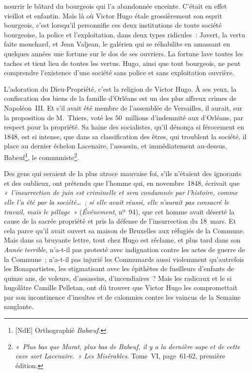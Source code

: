 \documentclass[french,twoside]{book} %
\begin{document}
\label{p45}nourrir le bâtard du bourgeois qui l’a abandonnée enceinte. C’était en effet vieillot et enfantin. Mais là où Victor Hugo étale grossièrement son esprit bourgeois, c’est lorsqu’il personnifie ces deux institutions de toute société bourgeoise, la police et l’exploitation, dans deux types ridicules : Javert, la vertu faite mouchard, et Jean Valjean, le galérien qui se réhabilite en amassant en quelques années une fortune sur le dos de ses ouvriers. La fortune lave toutes les taches et tient lieu de toutes les vertus. Hugo, ainsi que tout bourgeois, ne peut comprendre l’existence d’une société sans police et sans exploitation ouvrière.\par
L’adoration du Dieu-Propriété, c’est la religion de Victor Hugo. À ses yeux, la confiscation des biens de la famille d’Orléans est un des plus affreux crimes de Napoléon III. Et s’il avait été membre de l’assemblée de Versailles, il aurait, sur la proposition de M. Thiers, voté les 50 millions d’indemnité aux d’Orléans, par respect pour la propriété. Sa haine des socialistes, qu’il dénonça si férocement en 1848, est si intense, que dans sa classification des êtres, qui troublent la société, il place au dernier échelon Lacenaire, l’assassin, et immédiatement au-dessus, Babeuf\footnote{[NdE] Orthographié \emph{Babœuf.}}, le communiste\footnote{\emph{« Plus bas que Marat, plus bas de Babeuf, il y a la dernière sape et de cette cave sort Lacenaire. »} \emph{Les Misérables}. Tome VI, page 61-62, première édition.}.\par
Des gens qui seraient de la plus atroce mauvaise foi, s’ils n’étaient des ignorants et des oublieux, ont prétendu que l’homme qui, en novembre 1848, écrivait que \emph{« l’insurrection de juin est criminelle et  
\label{p46}sera condamnée par l’histoire, comme elle l’a été par la société… ; si elle avait réussi, elle n’aurait pas consacré le travail, mais le pillage »} (\emph{Événement}, nº 94), que cet homme avait déserté la cause de la sacrée propriété et pris la défense de l’insurrection du 18 mars. Et cela parce qu’il avait ouvert sa maison de Bruxelles aux réfugiés de la Commune. Mais dans sa bruyante lettre, tout chez Hugo est réclame, et plus tard dans son \emph{Année terrible}, n’a-t-il pas protesté avec indignation contre les actes de guerre de la Commune ; n’a-t-il pas injurié les Communards aussi violemment qu’autrefois les Bonapartistes, les stigmatisant avec les épithètes de fusilleurs d’enfants de quinze ans, de voleurs, d’assassins, d’incendiaires ? Mais les radicaux et le si hugolâtre Camille Pelletan, ont dû trouver que Victor Hugo les compromettait par son incontinence d’insultes et de calomnies contre les vaincus de la Semaine sanglante.\par
\end{document}
